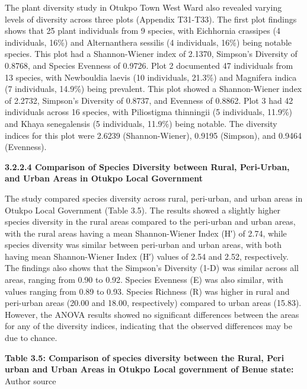 The plant diversity study in Otukpo Town West Ward also revealed varying levels of diversity across three plots (Appendix T31-T33). The first plot findings shows that 25 plant individuals from 9 species, with Eichhornia crassipes (4 individuals, 16\%) and Alternanthera sessilis (4 individuals, 16\%) being notable species. This plot had a Shannon-Wiener index of 2.1370, Simpson's Diversity of 0.8768, and Species Evenness of 0.9726. Plot 2 documented 47 individuals from 13 species, with Newbouldia laevis (10 individuals, 21.3\%) and Magnifera indica (7 individuals, 14.9\%) being prevalent. This plot showed a Shannon-Wiener index of 2.2732, Simpson's Diversity of 0.8737, and Evenness of 0.8862. Plot 3 had 42 individuals across 16 species, with Piliostigma thinningii (5 individuals, 11.9\%) and Khaya senegalensis (5 individuals, 11.9\%) being notable. The diversity indices for this plot were 2.6239 (Shannon-Wiener), 0.9195 (Simpson), and 0.9464 (Evenness).

{}\textbf{3.2.2.4 Comparison of Species Diversity between Rural, Peri-Urban, and Urban Areas in Otukpo Local Government}

The study compared species diversity across rural, peri-urban, and urban areas in Otukpo Local Government (Table 3.5). The results showed a slightly higher species diversity in the rural areas compared to the peri-urban and urban areas, with the rural areas having a mean Shannon-Wiener Index (H′) of 2.74, while species diversity was similar between peri-urban and urban areas, with both having mean Shannon-Wiener Index (H′) values of 2.54 and 2.52, respectively. The findings also shows that the Simpson's Diversity (1-D) was similar across all areas, ranging from 0.90 to 0.92. Species Evenness (E) was also similar, with values ranging from 0.89 to 0.93. Species Richness (R) was higher in rural and peri-urban areas (20.00 and 18.00, respectively) compared to urban areas (15.83). However, the ANOVA results showed no significant differences between the areas for any of the diversity indices, indicating that the observed differences may be due to chance.

\textbf{Table 3.5: Comparison of species diversity between the Rural, Peri urban and Urban Areas in Otukpo Local government of Benue state:} Author source

